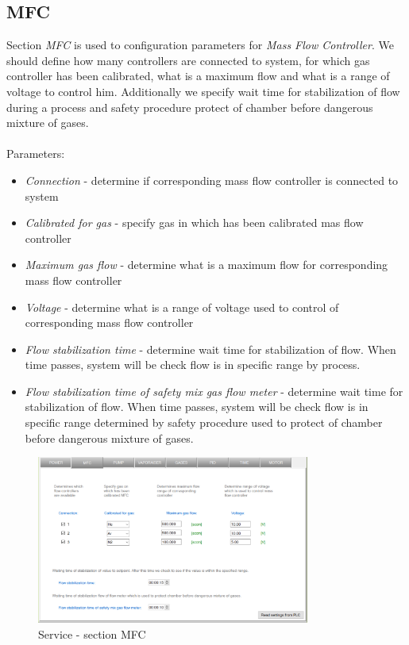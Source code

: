 \subsection{MFC}

Section \textit{MFC} is used to configuration parameters for \textit{Mass Flow Controller}. We should define how many controllers are connected to system, for which gas controller has been calibrated, what is a maximum flow and what is a range of voltage to control him. Additionally we specify wait time for stabilization of flow during a process and safety procedure protect of chamber before dangerous mixture of gases.\\\\
Parameters:
\begin{itemize}
	\item \textit{Connection} - determine if corresponding mass flow controller is connected to system
	\item \textit{Calibrated for gas} - specify gas in which has been calibrated mas flow controller
	\item \textit{Maximum gas flow} - determine what is a maximum flow for corresponding mass flow controller
	\item \textit{Voltage} - determine what is a range of voltage used to control of corresponding mass flow controller
	\item \textit{Flow stabilization time} - determine wait time for stabilization of flow. When time passes, system will be check flow is in specific range by process.
	\item \textit{Flow stabilization time of safety mix gas flow meter} - determine wait time for stabilization of flow. When time passes, system will be check flow is in specific range determined by safety procedure used to protect of chamber before dangerous mixture of gases.
\end{itemize}

	\begin{figure}[!h] 
	\centering \includegraphics[width=0.8\textwidth]{Graphic/Service/MFC.png}	
	\caption{Service - section MFC}
	\label{alerts_window}
	\end{figure}
	\FloatBarrier

